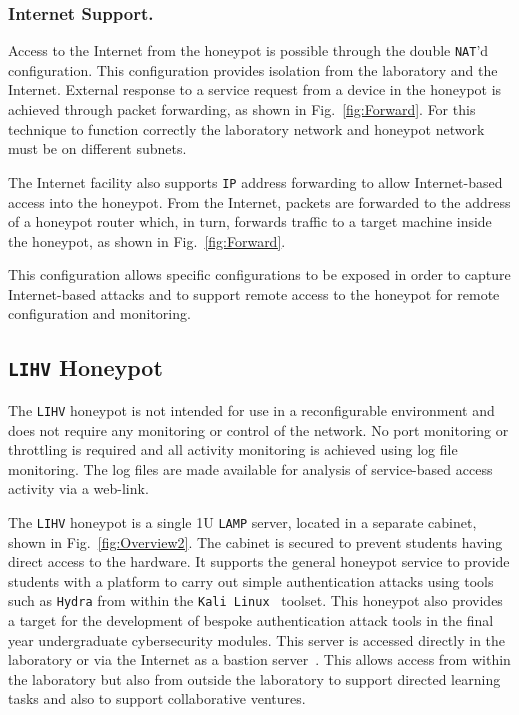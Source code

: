 \documentclass[10pt,journal]{IEEEtran}
\begin{document}
\subsubsection{Internet Support.}

Access to the Internet from the honeypot is possible through the double
\texttt{NAT}'d configuration. This configuration provides isolation from the
laboratory and the Internet. External response to a service request from a
device in the honeypot is achieved through packet forwarding, as shown in
Fig.~\ref{fig:Forward}. For this technique to function correctly the laboratory
network and honeypot network must be on different subnets.

The Internet facility also supports \texttt{IP} address forwarding to allow
Internet-based access into the honeypot. From the Internet, packets are
forwarded to the address of a honeypot router which, in turn, forwards traffic
to a target machine inside the honeypot, as shown in Fig.~\ref{fig:Forward}.

This configuration allows specific configurations to be exposed in order to
capture Internet-based attacks and to support remote access to the honeypot for
remote configuration and monitoring.

\subsection{\texttt{LIHV} Honeypot}

The \texttt{LIHV} honeypot is not intended for use in a reconfigurable
environment and does not require any monitoring or control of the network. No
port monitoring or throttling is required and all activity monitoring is
achieved using log file monitoring. The log files are made available 
for analysis of service-based access activity via a web-link.

The \texttt{LIHV} honeypot is a single 1U \texttt{LAMP} server, located in a
separate cabinet, shown in Fig.~\ref{fig:Overview2}. The cabinet is secured to
prevent students having direct access to the hardware. It supports the general
honeypot service to provide students with a platform to carry out simple
authentication attacks using tools such as \texttt{Hydra} from within the
\texttt{Kali Linux}~\cite{OS:17} toolset. This honeypot also provides a target
for the development of bespoke authentication attack tools in the final year
undergraduate cybersecurity modules.  This server is accessed directly in the
laboratory or via the Internet as a bastion server~\cite{MB:05}. This allows
access from within the laboratory but also from outside the laboratory to
support directed learning tasks and also to support collaborative ventures.
\end{document}
